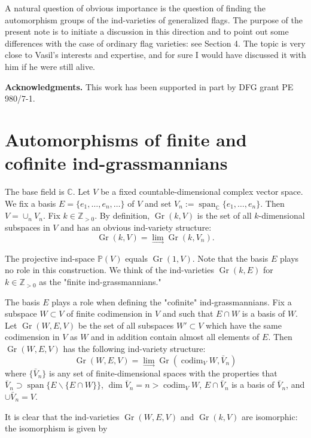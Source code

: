 \documentclass[11pt]{amsart}
\numberwithin{equation}{section}
\theoremstyle{plain}
\theoremstyle{remark}
\theoremstyle{remark}
\theoremstyle{construction}
\begin{document}
A natural question of obvious importance is the question of finding the automorphism groups of the ind-varieties of generalized flags. The purpose of the present note is to initiate a discussion in this direction and to point out some differences with the case of ordinary flag varieties: see Section 4. The topic is very close to Vasil's interests and expertise, and for sure I would have discussed it with him if he were still alive.



{\bf Acknowledgments.} This work has been supported in part by DFG grant PE 980/7-1. 

\section{Automorphisms of finite and cofinite ind-grassmannians}

The base field is $\mathbb C$. Let $V$ be a fixed countable-dimensional complex vector space.  We fix a basis $E=\{e_1,\dots,e_n,\dots\}$ of $V$ and set $V_n:=\operatorname{span}_{\mathbb C}\{e_1,\dots,e_n\}$. Then $V=\cup_n V_n$. Fix $k\in \mathbb{Z}_{>0}$. By definition, $\operatorname{Gr}(k,V)$ is the set of all $k$-dimensional subspaces in $V$ and has an obvious ind-variety structure:
$$\operatorname{Gr}(k,V)=\lim_{\longrightarrow}\operatorname{Gr}(k,V_n).$$

The projective ind-space $\mathbb{P}(V)$ equals $\operatorname{Gr}(1,V)$. Note that the basis $E$ plays no role in this construction. We think  of the ind-varieties $\operatorname{Gr}(k,E)$ for $k\in\mathbb{Z}_{>0}$ as the "finite ind-grassmannians."

The basis $E$ plays a role when defining the "cofinite" ind-grassmannians. Fix a subspace $W\subset V$ of finite codimension in $V$ and such that $E\cap W$ is a basis of $W$. Let $\operatorname{Gr}(W,E,V)$ be the set of all subspaces $W'\subset V$ which have the same codimension in $V$ as $W$ and in addition contain almost all elements of $E$. Then $\operatorname{Gr}(W,E,V)$ has the following ind-variety structure:
$$\operatorname{Gr}(W,E,V)=\lim_{\longrightarrow}\operatorname{Gr} (\operatorname{codim}_V W, \bar V_n)$$
where $\{\bar V_n\}$ is any set of finite-dimensional spaces with the properties that $\bar V_n\supset\operatorname{span}\{E\backslash \{E\cap W\}\}$, $\operatorname{dim}\bar V_n=n>\operatorname{codim}_V W$, $E\cap \bar V_n$ is a basis of $\bar V_n$, and $\cup \bar V_n=V$.


It is clear that the ind-varieties $\operatorname{Gr}(W,E,V)$ and $\operatorname{Gr}(k,V)$ are isomorphic: the isomorphism is given by
\end{document}
